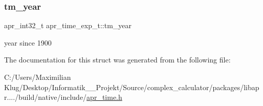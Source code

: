 \subsubsection{\texorpdfstring{tm\+\_\+year}{tm\_year}}
{\footnotesize\ttfamily apr\+\_\+int32\+\_\+t apr\+\_\+time\+\_\+exp\+\_\+t\+::tm\+\_\+year}

year since 1900 

The documentation for this struct was generated from the following file\+:\begin{DoxyCompactItemize}
\item 
C\+:/\+Users/\+Maximilian Klug/\+Desktop/\+Informatik\+\_\+\_\+\+Projekt/\+Source/complex\+\_\+calculator/packages/libapr..../build/native/include/\mbox{\hyperlink{apr__time_8h}{apr\+\_\+time.\+h}}\end{DoxyCompactItemize}
